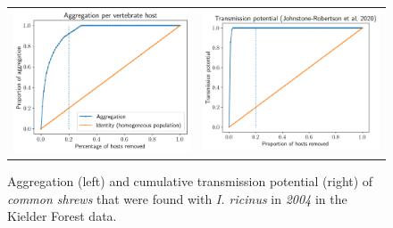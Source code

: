 \documentclass{article}
\begin{document}
\begin{figure}[]
	\begin{mdframed}[backgroundcolor=grey250,rightline=false,leftline=false,topline=false]
	\centering
	\begin{tabular}{ll}
		\includegraphics[width=.48\linewidth,valign=m]{lorenz_aggregation_SA_2004_I.Ricinus} & \includegraphics[width=.48\linewidth,valign=m]{lorenz_JR_SA_2004_I.Ricinus} \\
	\end{tabular}
	\caption{Aggregation (left) and cumulative transmission potential (right) of \textit{common shrews} that were found with \textit{I.  ricinus} in \textit{2004} in the Kielder Forest data.}
	\label{fig:lorenz_2004_iricinus_SA}
	\end{mdframed}
\end{figure}
\end{document}
